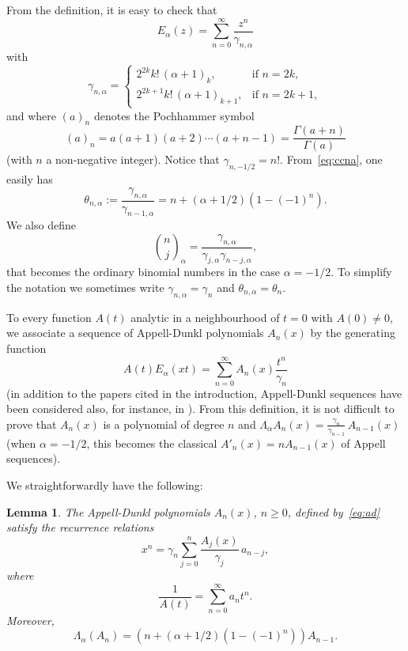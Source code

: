 \documentclass[10pt,a4paper]{article}
\theoremstyle{plain}
\newtheorem{lemma}[theorem]{Lemma}
\theoremstyle{definition}
\numberwithin{equation}{section} %
\newcommand{\Ea}{E_{\alpha}}
\newcommand{\La}{\Lambda_{\alpha}}
\newcommand{\cc}{\gamma}
\begin{document}
From the definition, it is easy to check that
\[
  \Ea(z) = \sum_{n=0}^\infty \frac{z^n}{\cc_{n,\alpha}}
\]
with
\begin{equation}
\label{eq:ccna}
  \cc_{n,\alpha} =
\begin{cases}
  2^{2k}k!\,(\alpha+1)_k, & \text{if $n=2k$},\\
  2^{2k+1}k!\,(\alpha+1)_{k+1}, & \text{if $n=2k+1$},
\end{cases}
\end{equation}
and where $(a)_n$ denotes the Pochhammer symbol
\[
  (a)_n = a(a+1)(a+2) \cdots (a+n-1) = \frac{\Gamma(a+n)}{\Gamma(a)}
\]
(with $n$ a non-negative integer). Notice that $\cc_{n,-1/2} = n!$.
From~\eqref{eq:ccna}, one easily has
\begin{equation}
\label{eq:coccc}
  \theta_{n,\alpha} := \frac{\cc_{n,\alpha}}{\cc_{n-1,\alpha}} = n+(\alpha+1/2)(1-(-1)^n).
\end{equation}
We also define
\[
  \binom{n}{j}_{\!\alpha} = \frac{\cc_{n,\alpha}}{\cc_{j,\alpha}\cc_{n-j,\alpha}},
\]
that becomes the ordinary binomial numbers in the case $\alpha=-1/2$.
To simplify the notation we sometimes write $\cc_{n,\alpha}=\cc_n$ and $\theta_{n,\alpha}=\theta_n$.

To every function $A(t)$ analytic in a neighbourhood of $t=0$ with $A(0) \ne 0$, we associate a sequence of Appell-Dunkl polynomials $A_n(x)$ by the generating function
\begin{equation}
\label{eq:ad}
  A(t)\Ea(xt) = \sum_{n=0}^\infty A_n(x) \frac{t^n}{\cc_n}
\end{equation}
(in addition to the papers \cite{AlS, Ros} cited in the introduction, Appell-Dunkl sequences have been considered also, for instance, in \cite{BG, BKI, DH}).
From this definition, it is not difficult to prove that $A_n(x)$ is a polynomial of degree $n$ and $\La A_n(x) = \frac{\cc_{n}}{\cc_{n-1}}\, A_{n-1}(x)$ (when $\alpha=-1/2$, this becomes the classical $A'_n(x) = nA_{n-1}(x)$ of Appell sequences).

We straightforwardly have the following:

\begin{lemma}
\label{lem:xn}
The Appell-Dunkl polynomials $A_n(x)$, $n\ge 0$, defined by~\eqref{eq:ad} satisfy the recurrence relations
\[
  x^n = \cc_n\sum_{j=0}^n \frac{A_j(x)}{\cc_j} \, a_{n-j},
\]
where
\[
  \frac{1}{A(t)} = \sum_{n=0}^\infty a_nt^n.
\]
Moreover,
\[
  \La(A_n) = (n+(\alpha+1/2)(1-(-1)^n))A_{n-1}.
\]
\end{lemma}
\end{document}
